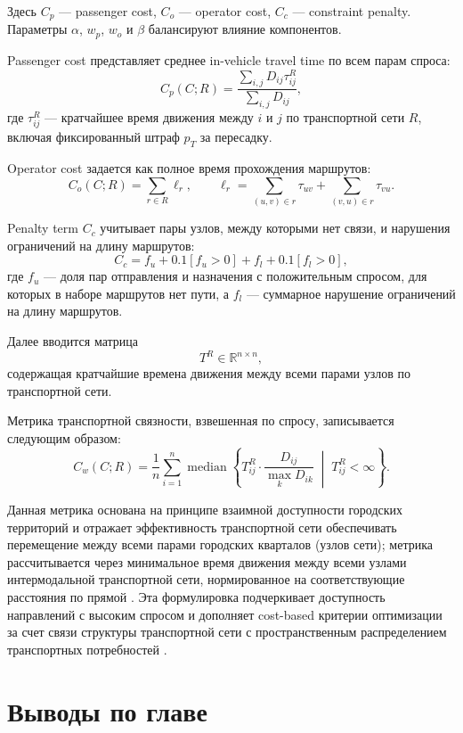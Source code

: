 Здесь $C_p$ --- passenger cost, $C_o$ --- operator cost, $C_c$ --- constraint penalty. Параметры $\alpha$, $w_p$, $w_o$ и $\beta$ балансируют влияние компонентов.

Passenger cost представляет среднее in-vehicle travel time по всем парам спроса:
\[
C_p(C;R)=
\frac{\sum_{i,j} D_{ij}\tau_{ij}^R}
{\sum_{i,j} D_{ij}},
\]
где $\tau_{ij}^R$ --- кратчайшее время движения между $i$ и $j$ по транспортной сети $R$, включая фиксированный штраф $p_T$ за пересадку.

Operator cost задается как полное время прохождения маршрутов:
\[
C_o(C;R)=\sum_{r\in R}\ell_r,
\qquad
\ell_r=\sum_{(u,v)\in r}\tau_{uv}+\sum_{(v,u)\in r}\tau_{vu}.
\]

Penalty term \(C_c\) учитывает пары узлов, между которыми нет связи, и нарушения ограничений на длину маршрутов:
\[
C_c=f_u+0.1[f_u>0]+f_l+0.1[f_l>0],
\]
где $f_u$ --- доля пар отправления и назначения с положительным спросом, для которых в наборе маршрутов нет пути, а $f_l$ --- суммарное нарушение ограничений на длину маршрутов.

Далее вводится матрица
\[
T^R\in\mathbb{R}^{n\times n},
\]
содержащая кратчайшие времена движения между всеми парами узлов по транспортной сети.

Метрика транспортной связности, взвешенная по спросу, записывается следующим образом:
\[
C_w(C;R)=
\frac{1}{n}
\sum_{i=1}^{n}
\operatorname{median}
\left\{
T_{ij}^R \cdot \frac{D_{ij}}{\max_k D_{ik}}
\;\middle|\;
T_{ij}^R < \infty
\right\}.
\]

Данная метрика основана на принципе взаимной доступности городских территорий и отражает эффективность транспортной сети обеспечивать перемещение между всеми парами городских кварталов (узлов сети); метрика рассчитывается через минимальное время движения между всеми узлами интермодальной транспортной сети, нормированное на соответствующие расстояния по прямой \cite{morozov2023transportConnectivity}. Эта формулировка подчеркивает доступность направлений с высоким спросом и дополняет cost-based критерии оптимизации за счет связи структуры транспортной сети с пространственным распределением транспортных потребностей \cite{morozov2026oneRuleTndp}.



\clearpage
\newpage
\section{Выводы по главе}
\label{sec:chapter3-conclusions}

